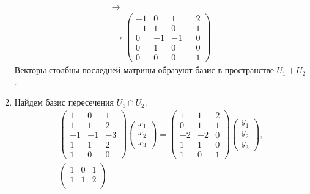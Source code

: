 \documentclass[12pt]{article}
\begin{document}
\begin{enumerate}
\begin{gather*}
            \rightarrow \\
            \rightarrow
            \begin{pmatrix}
                -1 & 0  & 1  & & 2 \\
                -1 & 1  & 0  & & 1 \\
                0  & -1 & -1 & & 0 \\
                0  & 1  & 0  & & 0 \\
                0  & 0  & 0  & & 1
            \end{pmatrix}
        \end{gather*}
        Векторы-столбцы последней матрицы образуют базис в пространстве $U_1 + U_2$.

        \item
        Найдем базис пересечения $U_1 \cap U_2$:
        \begin{gather*}
            \begin{pmatrix}
                1  & 0  & 1  \\
                1  & 1  & 2  \\
                -1 & -1 & -3 \\
                1  & 1  & 2  \\
                1  & 0  & 0
            \end{pmatrix}
            \begin{pmatrix}
                x_1 \\ x_2 \\ x_3
            \end{pmatrix}
            =
            \begin{pmatrix}
                1  & 1  & 2 \\
                0  & 1  & 1 \\
                -2 & -2 & 0 \\
                1  & 1  & 0 \\
                1  & 0  & 1
            \end{pmatrix}
            \begin{pmatrix}
                y_1 \\ y_2 \\ y_3
            \end{pmatrix} , \\
            \begin{pmatrix}
                1 & 0 & 1  \\
                1 & 1 & 2  \\

\end{pmatrix}
\end{gather*}
\end{enumerate}
\end{document}
